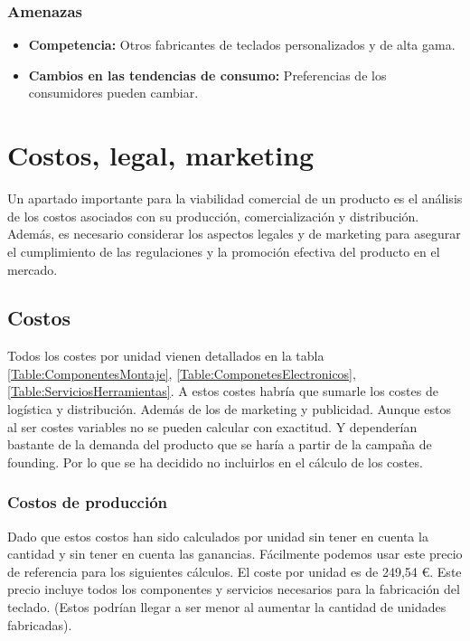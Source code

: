 \subsubsection{Amenazas}

\begin{itemize}
    \item \textbf{Competencia:} Otros fabricantes de teclados personalizados y de alta gama.
    \item \textbf{Cambios en las tendencias de consumo:} Preferencias de los consumidores pueden cambiar.
\end{itemize}

\section{Costos, legal, marketing}

Un apartado importante para la viabilidad comercial de un producto es el análisis de los costos asociados con su producción, comercialización y distribución. Además, es necesario considerar los aspectos legales y de marketing para asegurar el cumplimiento de las regulaciones y la promoción efectiva del producto en el mercado.

\subsection{Costos}

Todos los costes por unidad vienen detallados en la tabla \ref{Table:ComponentesMontaje}, \ref{Table:ComponetesElectronicos}, \ref{Table:ServiciosHerramientas}. A estos costes habría que sumarle los costes de logística y distribución. Además de los de marketing y publicidad. Aunque estos al ser costes variables no se pueden calcular con exactitud. Y dependerían bastante de la demanda del producto que se haría a partir de la campaña de founding. Por lo que se ha decidido no incluirlos en el cálculo de los costes.

\subsubsection{Costos de producción} \label{SeccionCostosProduccion}

Dado que estos costos han sido calculados por unidad sin tener en cuenta la cantidad y sin tener en cuenta las ganancias. Fácilmente podemos usar este precio de referencia para los siguientes cálculos. El coste por unidad es de 249,54 \euro. Este precio incluye todos los componentes y servicios necesarios para la fabricación del teclado. (Estos podrían llegar a ser menor al aumentar la cantidad de unidades fabricadas).

